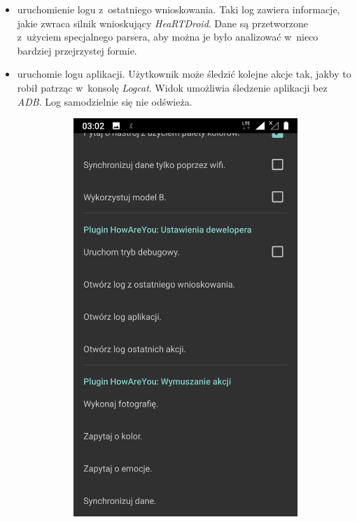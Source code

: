 \begin{itemize}
	\item uruchomienie logu z~ostatniego wnioskowania. Taki log zawiera informacje, jakie zwraca silnik wnioskujący \textit{HeaRTDroid}. Dane są przetworzone z~użyciem specjalnego parsera, aby można je było analizować w~nieco bardziej przejrzystej formie.
	
	\item uruchomie logu aplikacji. Użytkownik może śledzić kolejne akcje tak, jakby to robił patrząc w~konsolę \textit{Logcat}. Widok umożliwia śledzenie aplikacji bez \textit{ADB}. Log samodzielnie się nie odświeża.
	
	\begin{figure}[H]
		\centering
		\begin{subfigure}{0.35\textwidth}
			\centering
			\includegraphics[scale=0.13]{rozdzial3/Ustawienia_cz2.png}

\end{subfigure}
\end{figure}
\end{itemize}
